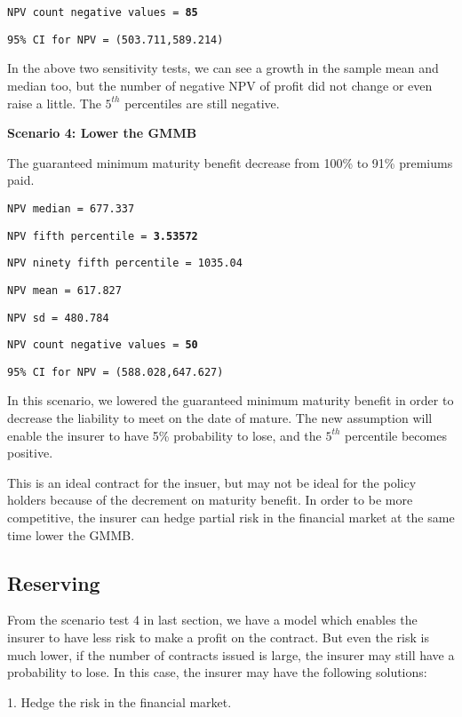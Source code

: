 \documentclass{report}
\begin{document}
{{\texttt{NPV count negative values = \textbf{85}}

\texttt{95\% CI for NPV = (503.711,589.214)}
\par}

In the above two sensitivity tests, we can see a growth in the sample mean and median too, but the number of negative NPV of profit did not change or even raise a little. The $5^{th}$ percentiles are still negative.


\textbf{Scenario 4: Lower the GMMB}

The guaranteed minimum maturity benefit decrease from 100\% to 91\% premiums paid.

\texttt{NPV median = 677.337}

{\renewcommand\baselinestretch{1}\selectfont

\texttt{NPV fifth percentile = \textbf{3.53572}}

\texttt{NPV ninety fifth percentile = 1035.04}

\texttt{NPV mean = 617.827}

\texttt{NPV sd = 480.784}

\texttt{NPV count negative values = \textbf{50}}

\texttt{95\% CI for NPV = (588.028,647.627)}
\par}

In this scenario, we lowered the guaranteed minimum maturity benefit in order to decrease the liability to meet on the date of mature. The new assumption will enable the insurer to have 5\% probability to lose, and the $5^{th}$ percentile becomes positive. 

This is an ideal contract for the insuer, but may not be ideal for the policy holders because of the decrement on maturity benefit. In order to be more competitive, the insurer can hedge partial risk in the financial market at the same time lower the  GMMB.


\subsection{Reserving}


From the scenario test 4 in last section, we have a model which enables the insurer to have less risk to make a profit on the contract. But even the risk is much lower, if the number of contracts issued is large, the insurer may still have a probability to lose. In this case, the insurer may have the following solutions\cite{bib:reserve}:

1. Hedge the risk in the financial market.

}
\end{document}
